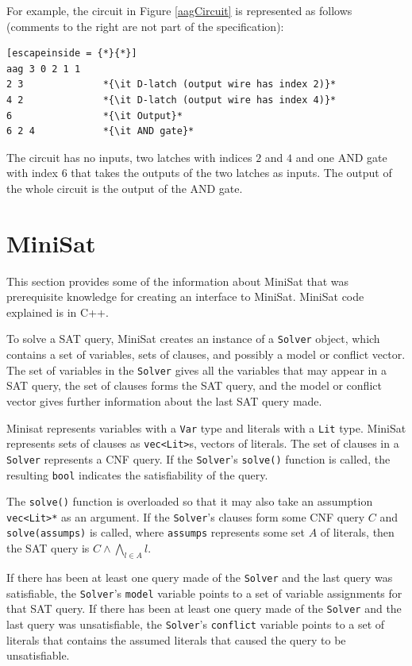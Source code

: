\documentclass[12pt,a4paper,twoside,openright]{report}
\begin{document}
{{{For example, the circuit in Figure \ref{aagCircuit} is represented
as follows (comments to the right are not part of the specification):
\begin{lstlisting}[escapeinside = {*}{*}]
aag 3 0 2 1 1
2 3              *{\it D-latch (output wire has index 2)}*
4 2              *{\it D-latch (output wire has index 4)}*
6                *{\it Output}*
6 2 4            *{\it AND gate}*
\end{lstlisting}
The circuit has no inputs, two latches with indices $2$ and $4$ and one AND gate
with index $6$ that takes the outputs of the two latches as inputs.
The output of the whole circuit is the output of the AND gate.
}


\section{MiniSat}
\label{prep:minisat}

This section provides some of the information about MiniSat that
was prerequisite knowledge for creating an interface to MiniSat. MiniSat code
explained is in C++.

To solve a SAT query, MiniSat creates an instance of a \verb,Solver, object,
which contains a set of variables, sets of clauses, and possibly a model or conflict vector.
The set of variables in the \verb,Solver, gives all the variables that may appear in
a SAT query, the set of clauses forms the SAT query, and the model or conflict vector
gives further information about the last SAT query made.

Minisat represents variables with a \verb,Var, type and
literals with a \verb,Lit, type.
MiniSat represents sets of clauses as \verb,vec<Lit>,s,
vectors of literals. The set of clauses in a \verb,Solver, represents a CNF query.
If the \verb,Solver,'s \verb,solve(), function is called,
the resulting \verb,bool, indicates the satisfiability of the query.

The \verb,solve(), function is overloaded so that it may also take an assumption \verb,vec<Lit>*, as
an argument.
If the \verb,Solver,'s clauses form some CNF query $C$ and
\verb,solve(assumps), is called, where \verb,assumps, represents some set $A$ of literals,
then the SAT query is $C \wedge \bigwedge_{l \in A} l$.

If there has been at least one query made of the \verb,Solver, and the last query was
satisfiable, the \verb,Solver,'s \verb,model, variable points to a set of variable assignments
for that SAT query.
If there has been at least one query made of the \verb,Solver, and the last query was
unsatisfiable, the \verb,Solver,'s \verb,conflict, variable points to a set of literals that
contains the assumed literals that caused the query to be unsatisfiable.

}}
\end{document}
